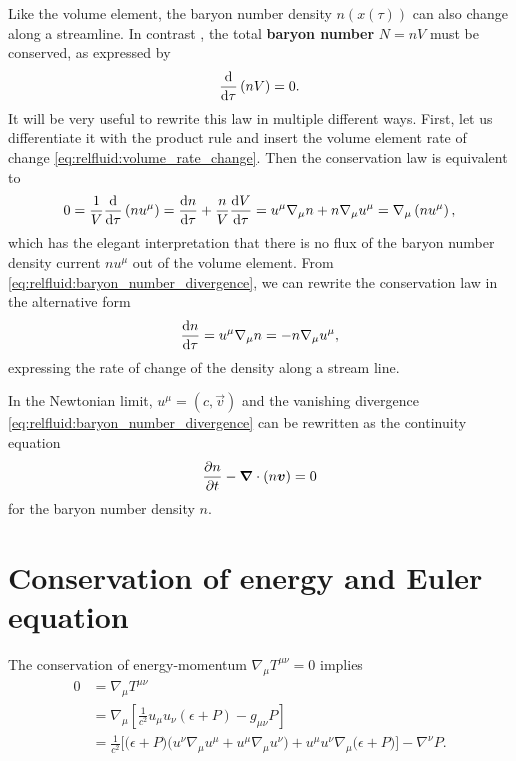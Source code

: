 Like the volume element, the baryon number density $n(x(\tau))$ can also change along a streamline.
In contrast , the total \textbf{baryon number} $N = n V$ must be conserved, as expressed by
\begin{equation}
	\odv*{\left( n V \right)}{\tau} = 0 .
\label{eq:relfluid:baryon_number_constant}
\end{equation}
It will be very useful to rewrite this law in multiple different ways.
First, let us differentiate it with the product rule and insert the volume element rate of change \eqref{eq:relfluid:volume_rate_change}.
Then the conservation law is equivalent to
\begin{equation}
	0 = \frac{1}{V} \odv*{\left( n u^\mu \right)}{\tau}
	  = \odv{n}{\tau} + \frac{n}{V} \odv{V}{\tau}
	  = u^\mu \nabla_\mu n + n \nabla_\mu u^\mu
	  = \nabla_\mu \left( n u^\mu \right) ,
\label{eq:relfluid:baryon_number_divergence}
\end{equation}
which has the elegant interpretation that there is no flux of the baryon number density current $n u^\mu$ out of the volume element.
From \cref{eq:relfluid:baryon_number_divergence}, we can rewrite the conservation law in the alternative form
\begin{equation}
	\odv{n}{\tau} = u^\mu \nabla_\mu n
	              = -n \nabla_\mu u^\mu ,
\label{eq:relfluid:baryon_number_rate_change}
\end{equation}
expressing the rate of change of the density along a stream line.

In the Newtonian limit, $u^\mu = (c, \vec{v})$ and the vanishing divergence \cref{eq:relfluid:baryon_number_divergence} can be rewritten as the continuity equation
\begin{equation}
	\pdv{n}{t} - {\bm{\nabla}} \cdot \left( n {\bm{v}} \right) = 0
\end{equation}
for the baryon number density $n$.

\section{Conservation of energy and Euler equation}

The conservation of energy-momentum $\nabla_\mu T^{\mu \nu} = 0$ implies
\begin{equation}
\begin{split}
	0 &= \nabla_\mu T^{\mu \nu} \\
	  &= \nabla_\mu \left[ \frac{1}{c^2} u_\mu u_\nu (\epsilon + P) - g_{\mu \nu} P \right] \\
	  &= \frac{1}{c^2} \bigg[ \Big( \epsilon + P \Big) \Big( u^\nu \nabla_\mu u^\mu + u^\mu \nabla_\mu u^\nu \Big) + u^\mu u^\nu \nabla_\mu \Big( \epsilon + P \Big) \bigg] - \nabla^\nu P . \\
\end{split}
\label{eq:relfluid:conservation_energy_momentum}
\end{equation}

